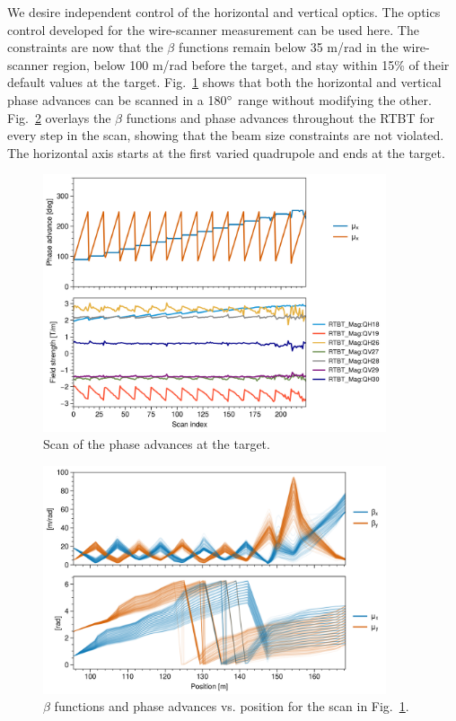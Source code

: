 We desire independent control of the horizontal and vertical optics. The optics control developed for the wire-scanner measurement can be used here. The constraints are now that the $\beta$ functions remain below 35 m/rad in the wire-scanner region, below 100 m/rad before the target, and stay within 15\% of their default values at the target. Fig.~\ref{fig:target_phase_scan_1} shows that both the horizontal and vertical phase advances can be scanned in a 180$\degree$ range without modifying the other. Fig.~\ref{fig:target_phase_scan_2} overlays the $\beta$ functions and phase advances throughout the RTBT for every step in the scan, showing that the beam size constraints are not violated. The horizontal axis starts at the first varied quadrupole and ends at the target.
%
\begin{figure}[!p]
    \centering
    \vspace*{2.0cm}
    \includegraphics[width=0.9\textwidth]{Images/chapter4/target_phase_scan1.png}
    \caption{Scan of the phase advances at the target.}
     \label{fig:target_phase_scan_1}
    \vspace*{2.0cm}
\end{figure}
%
\begin{figure}[!p]
    \centering
    \includegraphics[width=0.9\textwidth]{Images/chapter4/target_phase_scan2.png}
    \caption{$\beta$ functions and phase advances vs. position for the scan in Fig.~\ref{fig:target_phase_scan_1}.}
    \label{fig:target_phase_scan_2}
\end{figure}
